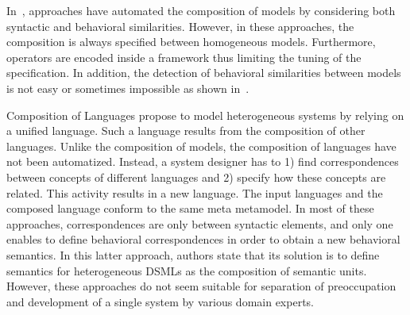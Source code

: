 In~\cite{compostatechartsbib,weavingbib}, approaches have automated the composition of models by considering both syntactic and behavioral similarities. However, in these approaches, the composition is always specified between homogeneous models. Furthermore, operators are encoded inside a framework thus limiting the tuning of the specification. In addition, the detection of behavioral similarities between models is not easy or sometimes impossible as shown in~\cite{?}. 

Composition of Languages propose to model heterogeneous systems by relying on a unified language. Such a language results from the composition of other languages. Unlike the composition of models, the composition of languages have not been automatized. Instead, a system designer has to 1) find correspondences between concepts of different languages and 2) specify how these concepts are related. This activity results in a new language. The input languages and the composed language conform to the same meta metamodel. In most of these approaches, correspondences are only between syntactic elements, and only one enables to define behavioral correspondences in order to obtain a new behavioral semantics. In this latter approach, authors state that its solution is to define semantics for heterogeneous DSMLs as the composition of semantic units. However, these approaches do not seem suitable for separation of preoccupation and development of a single system by various domain experts. 
